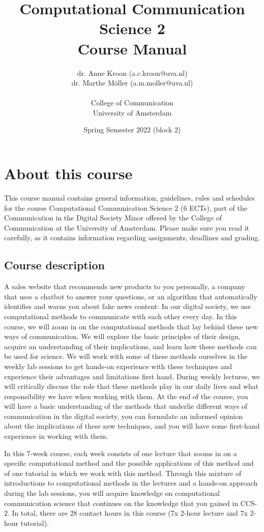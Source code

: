 \documentclass[a4paper,10pt,twocolumn]{report}
\title{Computational Communication Science 2\\ Course Manual}
\author{dr. Anne Kroon (a.c.kroon@uva.nl)\\dr. Marthe Möller (a.m.moller@uva.nl) \\~\\College of Communication\\University of Amsterdam}
\date{Spring Semester 2022 (block 2)}
\begin{document}
	\maketitle
	
	\tableofcontents

	
	\chapter{About this course}
	
	This course manual contains general information, guidelines, rules and schedules for the course Computational Communication Science 2 (6 ECTs), part of the Communication in the Digital Society Minor offered by the College of Communication at the University of Amsterdam. Please make sure you read it carefully, as it  contains information regarding assignments, deadlines and grading.
	
	\section{Course description}
	
	A sales website that recommends new products to you personally, a company that uses a chatbot to answer your questions, or an algorithm that automatically identifies and warns you about fake news content: In our digital society, we use computational methods to communicate with each other every day. In this course, we will zoom in on the computational methods that lay behind these new ways of communication. We will explore the basic principles of their design, acquire an understanding of their implications, and learn how these methods can be used for science. We will work with some of these methods ourselves in the weekly lab sessions to get hands-on experience with these techniques and experience their advantages and limitations first hand. During weekly lectures, we will critically discuss the role that these methods play in our daily lives and what responsibility we have when working with them. At the end of the course, you will have a basic understanding of the methods that underlie different ways of communication in the digital society, you can formulate an informed opinion about the implications of these new techniques, and you will have some first-hand experience in working with them.
	
	In this 7-week course, each week consists of one lecture that zooms in on a specific computational method and the possible applications of this method and of one tutorial in which we work with this method. Through this mixture of introductions to computational methods in the lectures and a hands-on approach during the lab sessions, you will acquire knowledge on computational communication science that continues on the knowledge that you gained in CCS-2. In total, there are 28 contact hours in this course (7x 2-hour lecture and 7x 2-hour tutorial). 
	
\end{document}
